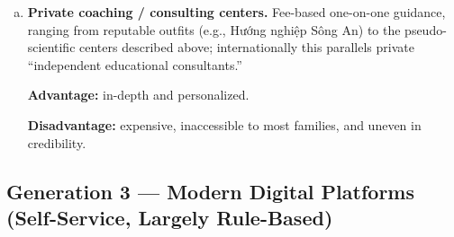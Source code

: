\documentclass[a4paper]{article}
\begin{document}
\begin{enumerate}[a.]
    \par\smallskip\noindent
    \textbf{Advantage:} motivational, free to attend, and offers direct contact with real
    schools.

    \par\smallskip\noindent
    \textbf{Disadvantage:} episodic and usually aimed at grade 12 --- too late for the
    grade-10 subject-combination decision --- and information-dense rather than personalized.

    \item \textbf{Private coaching / consulting centers.} Fee-based one-on-one guidance,
    ranging from reputable outfits (e.g., Hướng nghiệp Sông An) to the pseudo-scientific centers
    described above; internationally this parallels private ``independent educational
    consultants.''

    \par\smallskip\noindent
    \textbf{Advantage:} in-depth and personalized.

    \par\smallskip\noindent
    \textbf{Disadvantage:}
    expensive, inaccessible to most families, and uneven in credibility.
\end{enumerate}

\subsection{Generation 3 --- Modern Digital Platforms (Self-Service, Largely Rule-Based)}
\end{document}
